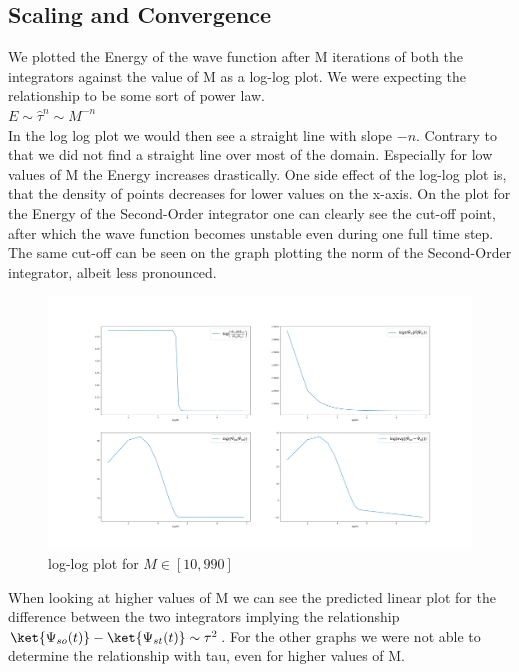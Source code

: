 \documentclass[11pt, letterpaper, onecolumn]{article}
\begin{document}
\subsection{Scaling and Convergence}
We plotted the Energy of the wave function after M iterations of both the integrators against the value of M as a log-log plot. We were expecting the relationship to be some sort of power law. \\
$E\sim \hat{\tau}^n\sim M^{-n}$\\
In the log log plot we would then see a straight line with slope $-n$. Contrary to that we did not find a straight line over most of the domain. Especially for low values of M the Energy increases drastically. One side effect of the log-log plot is, that the density of points decreases for lower values on the x-axis. On the plot for the Energy of the Second-Order integrator one can clearly see the cut-off point, after which the wave function becomes unstable even during one full time step. The same cut-off can be seen on the graph plotting the norm of the Second-Order integrator, albeit less pronounced.
\begin{figure}[!h]
    \centering
    \includegraphics[width=.9\textwidth]{logvlog.png}
    \caption{log-log plot for $M\in[10, 990]$ }
\end{figure}\noindent\newline
When looking at higher values of M we can see the predicted linear plot for the difference between the two integrators implying the relationship $\ket{\Psi_{so}(t)}-\ket{\Psi_{st}(t)}\sim\tau^2$. For the other graphs we were not able to determine the relationship with tau, even for higher values of M.
\end{document}
